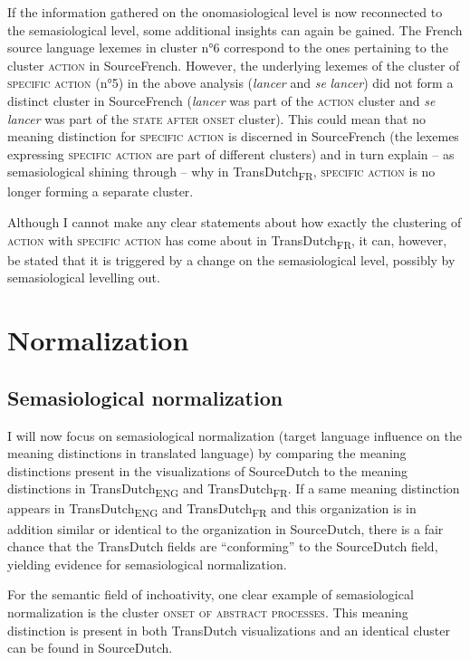 If the information gathered on the onomasiological level is now reconnected to the semasiological level, some additional insights can again be gained. The French source language lexemes in cluster n°6 correspond to the ones pertaining to the cluster \textsc{action} in SourceFrench. However, the underlying lexemes of the cluster of {\textsc{specific}} \textsc{action} (n°5) in the above analysis (\textit{lancer} and \textit{se} \textit{lancer}) did not form a distinct cluster in SourceFrench (\textit{lancer} was part of the \textsc{action} cluster and \textit{se} \textit{lancer} was part of the \textsc{state after onset} cluster). This could mean that no meaning distinction for {\textsc{specific}} \textsc{action} is discerned in SourceFrench (the lexemes expressing {\textsc{specific}} \textsc{action} are part of different clusters) and in turn explain – as semasiological shining through – why in TransDutch\textsubscript{FR}, {\textsc{specific}} \textsc{action} is no longer forming a separate cluster.

Although I cannot make any clear statements about how exactly the clustering of \textsc{action} with {\textsc{specific}} \textsc{action} has come about in TransDutch\textsubscript{FR}, it can, however, be stated that it is triggered by a change on the semasiological level, possibly by semasiological levelling out.

\section{Normalization}
\label{sec:4.7}  
\subsection{Semasiological normalization}
\label{sec:4.7.1}  
I will now focus on semasiological normalization (target language influence on the meaning distinctions in translated language) by comparing the meaning distinctions present in the visualizations of SourceDutch to the meaning distinctions in TransDutch\textsubscript{ENG} and TransDutch\textsubscript{FR}. If a same meaning distinction appears in TransDutch\textsubscript{ENG} and TransDutch\textsubscript{FR} and this organization is in addition similar or identical to the organization in SourceDutch, there is a fair chance that the TransDutch fields are ``conforming'' to the SourceDutch field, yielding evidence for semasiological normalization.

For the semantic field of inchoativity, one clear example of semasiological normalization is the cluster {\textsc{onset of abstract processes}}. This meaning distinction is present in both TransDutch visualizations and an identical cluster can be found in SourceDutch.

